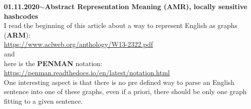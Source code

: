 \documentclass[11pt,a4paper]{article}
\newenvironment{loggentry}[2]%
{\noindent\textbf{#1}\hspace{1cm}$\mathbf{\sim}$\text{ }\textbf{#2}\\}{\vspace{0.5cm}}
\begin{document}
\begin{loggentry}{01.11.2020}{Abstract Representation Meaning (AMR), locally sensitive hashcodes}

I read the beginning of this article about a way to represent English as graphs (\textbf{ARM}):\\
\url{https://www.aclweb.org/anthology/W13-2322.pdf}\\
and\\
here is the \textbf{PENMAN} notation:\\
\url{https://penman.readthedocs.io/en/latest/notation.html}\\
One interesting aspect is that there is no pre defined way to parse an English sentence into one of these graphs, even if a priori, there should be only one graph fitting to a given sentence.\\


\end{loggentry}
\end{document}
